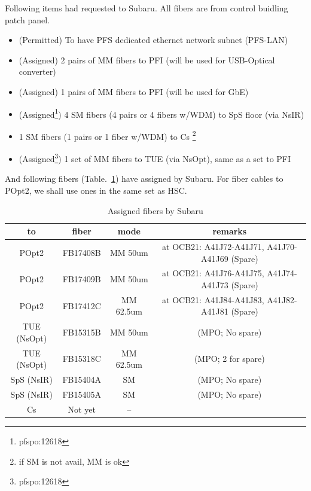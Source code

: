 \documentclass[a4paper,notitlepage]{article}
\begin{document}
Following items had requested to Subaru. 
All fibers are from control buidling patch panel. 

\begin{itemize}
  \item (Permitted) To have PFS dedicated ethernet network subnet (PFS-LAN)
  \item (Assigned) 2 pairs of MM fibers to PFI
    (will be used for USB-Optical converter)
  \item (Assigned) 1 pairs of MM fibers to PFI
    (will be used for GbE)
  \item (Assigned\footnote{pfspo:12618}) 
    4 SM fibers (4 pairs or 4 fibers w/WDM) to SpS floor (via NsIR)
  \item 1 SM fibers (1 pairs or 1 fiber w/WDM) to Cs
    \footnote{if SM is not avail, MM is ok}
  \item (Assigned\footnote{pfspo:12618}) 
    1 set of MM fibers to TUE (via NsOpt), same as a set to PFI
\end{itemize}

And following fibers (Table.~\ref{tab:subaru-fiber}) have assigned by Subaru. 
For fiber cables to POpt2, we shall use ones in the same set as HSC. 

\begin{table}[htb]
\begin{center}
\caption{Assigned fibers by Subaru}
\label{tab:subaru-fiber}
\begin{tabular}{c|c|c|c}
to & fiber & mode & remarks \\
\hline
POpt2 & FB17408B & MM 50um & at OCB21: A41J72-A41J71, A41J70-A41J69 (Spare) \\
POpt2 & FB17409B & MM 50um & at OCB21: A41J76-A41J75, A41J74-A41J73 (Spare) \\
POpt2 & FB17412C & MM 62.5um & at OCB21: A41J84-A41J83, A41J82-A41J81 (Spare) \\
\hline
TUE (NsOpt) & FB15315B & MM 50um & (MPO; No spare) \\
TUE (NsOpt) & FB15318C & MM 62.5um & (MPO; 2 for spare) \\
\hline
SpS (NsIR) & FB15404A & SM & (MPO; No spare) \\
SpS (NsIR) & FB15405A & SM & (MPO; No spare) \\
\hline
Cs & Not yet & -- &  \\
\end{tabular}
\end{center}
\end{table}
\end{document}
